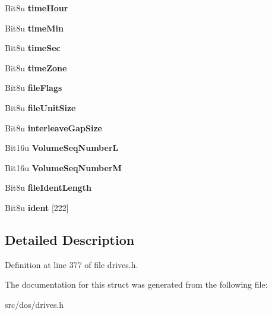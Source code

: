 \begin{DoxyCompactItemize}
\item 
\hypertarget{structisoDirEntry_ad5f7d5ba46e893d19ef699d39a44b875}{Bit8u {\bfseries time\-Hour}}\label{structisoDirEntry_ad5f7d5ba46e893d19ef699d39a44b875}

\item 
\hypertarget{structisoDirEntry_a8babe3c17f3931ffbe6cbba20cfb18b8}{Bit8u {\bfseries time\-Min}}\label{structisoDirEntry_a8babe3c17f3931ffbe6cbba20cfb18b8}

\item 
\hypertarget{structisoDirEntry_aeeda5230d96dd1fc08463136d84f673b}{Bit8u {\bfseries time\-Sec}}\label{structisoDirEntry_aeeda5230d96dd1fc08463136d84f673b}

\item 
\hypertarget{structisoDirEntry_a989029e709520fd23b8dbe878b66e729}{Bit8u {\bfseries time\-Zone}}\label{structisoDirEntry_a989029e709520fd23b8dbe878b66e729}

\item 
\hypertarget{structisoDirEntry_a6c73c88e3eb3329d826091048233e783}{Bit8u {\bfseries file\-Flags}}\label{structisoDirEntry_a6c73c88e3eb3329d826091048233e783}

\item 
\hypertarget{structisoDirEntry_a079492a83780a0316e44bc79b53102e1}{Bit8u {\bfseries file\-Unit\-Size}}\label{structisoDirEntry_a079492a83780a0316e44bc79b53102e1}

\item 
\hypertarget{structisoDirEntry_a6075892ffd1990542c8e68deb4621ddb}{Bit8u {\bfseries interleave\-Gap\-Size}}\label{structisoDirEntry_a6075892ffd1990542c8e68deb4621ddb}

\item 
\hypertarget{structisoDirEntry_ac4632844fa457e6a3efe05744db8e08e}{Bit16u {\bfseries Volume\-Seq\-Number\-L}}\label{structisoDirEntry_ac4632844fa457e6a3efe05744db8e08e}

\item 
\hypertarget{structisoDirEntry_a993c6f1d2836d163140d7c447da856ee}{Bit16u {\bfseries Volume\-Seq\-Number\-M}}\label{structisoDirEntry_a993c6f1d2836d163140d7c447da856ee}

\item 
\hypertarget{structisoDirEntry_a80c4c5121bb984a0d310d897f1cfaecb}{Bit8u {\bfseries file\-Ident\-Length}}\label{structisoDirEntry_a80c4c5121bb984a0d310d897f1cfaecb}

\item 
\hypertarget{structisoDirEntry_adcd0165ef3a6a392c001c2c3d0326b98}{Bit8u {\bfseries ident} \mbox{[}222\mbox{]}}\label{structisoDirEntry_adcd0165ef3a6a392c001c2c3d0326b98}

\end{DoxyCompactItemize}


\subsection{Detailed Description}


Definition at line 377 of file drives.\-h.



The documentation for this struct was generated from the following file\-:\begin{DoxyCompactItemize}
\item 
src/dos/drives.\-h\end{DoxyCompactItemize}
